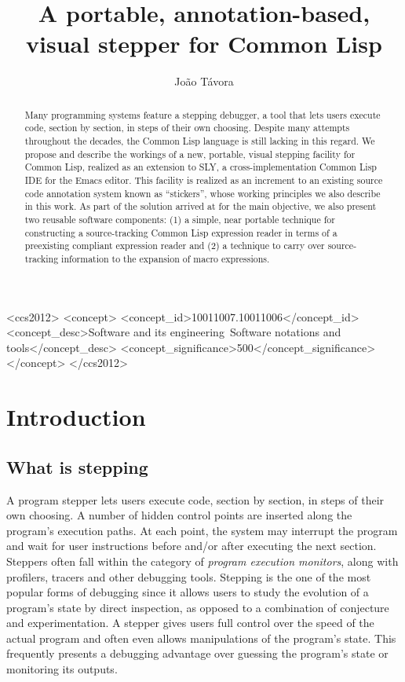 \documentclass[sigconf]{acmart}
\author{João Távora} \affiliation{Ravenpack}
\begin{document}
\title{A portable, annotation-based, visual stepper for Common Lisp}

\begin{abstract}
  Many programming systems feature a stepping debugger, a tool that
  lets users execute code, section by section, in steps of their own
  choosing.  Despite many attempts throughout the decades, the Common
  Lisp language is still lacking in this regard.  We propose and
  describe the workings of a new, portable, visual stepping facility
  for Common Lisp, realized as an extension to SLY, a
  cross-implementation Common Lisp IDE for the Emacs editor.  This
  facility is realized as an increment to an existing source code
  annotation system known as ``stickers'', whose working principles we
  also describe in this work.  As part of the solution arrived at for
  the main objective, we also present two reusable software
  components: (1) a simple, near portable technique for constructing a
  source-tracking Common Lisp expression reader in terms of a
  preexisting compliant expression reader and (2) a technique to carry
  over source-tracking information to the expansion of macro
  expressions.
\end{abstract}


\begin{CCSXML}
<ccs2012>
   <concept>
       <concept_id>10011007.10011006</concept_id>
       <concept_desc>Software and its engineering~Software notations and tools</concept_desc>
       <concept_significance>500</concept_significance>
       </concept>
 </ccs2012>
\end{CCSXML}


\maketitle
\section{Introduction}
\subsection{What is stepping}

A program stepper lets users execute code, section by section, in
steps of their own choosing.  A number of hidden control points are
inserted along the program's execution paths.  At each point, the
system may interrupt the program and wait for user instructions before
and/or after executing the next section.  Steppers often fall within
the category of \emph{program execution monitors}, along with
profilers, tracers and other debugging tools.  Stepping is the one of
the most popular forms of debugging since it allows users to study the
evolution of a program's state by direct inspection, as opposed to a
combination of conjecture and experimentation.  A stepper gives users
full control over the speed of the actual program and often even
allows manipulations of the program's state.  This frequently presents
a debugging advantage over guessing the program's state or monitoring
its outputs.
\end{document}
